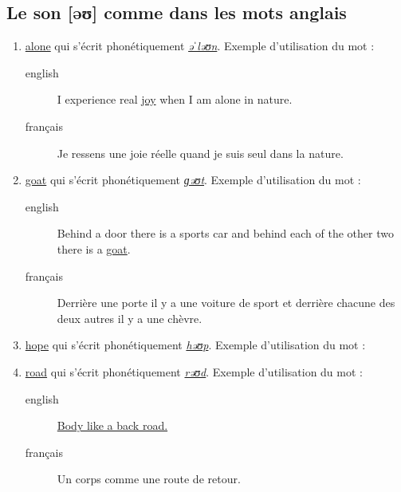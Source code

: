 \documentclass[12pt,a4paper]{book}
\begin{document}
\subsection{Le son [əʊ] comme dans les mots anglais}
\label{sec:org7325c5a}
\begin{enumerate}
\item \href{http://www.wordreference.com/enfr/alone}{alone} qui s'écrit phonétiquement \href{https://en.oxforddictionaries.com/definition/alone}{\emph{əˈləʊn}}. Exemple d'utilisation du mot :
\begin{description}
\item[{english}] \textenglish{I experience real \href{https://youtu.be/cnsk7iXFCtY}{joy} when I am alone in nature.}
\item[{français}] Je ressens une joie réelle quand je suis seul dans la
nature.
\end{description}
\item \href{http://www.wordreference.com/enfr/goat}{goat} qui s'écrit phonétiquement \href{https://en.oxforddictionaries.com/definition/goat}{\emph{ɡəʊt}}. Exemple d'utilisation du mot :
\begin{description}
\item[{english}] \textenglish{Behind a door there is a sports car and behind each of
the other two there is a \href{https://youtu.be/pEHWbpy-EpI}{goat}.}
\item[{français}] Derrière une porte il y a une voiture de sport et
derrière chacune des deux autres il y a une chèvre.
\end{description}
\item \href{http://www.wordreference.com/enfr/hope}{hope} qui s'écrit phonétiquement \href{https://en.oxforddictionaries.com/definition/hope}{\emph{həʊp}}. Exemple d'utilisation du mot :
\item \href{http://www.wordreference.com/enfr/road}{road} qui s'écrit phonétiquement \href{https://en.oxforddictionaries.com/definition/road}{\emph{rəʊd}}. Exemple d'utilisation du mot :
\begin{description}
\item[{english}] \textenglish{\href{https://youtu.be/jzmy6iUGDo8}{Body like a back road.}}
\item[{français}] Un corps comme une route de retour.
\end{description}
\end{enumerate}
\end{document}
